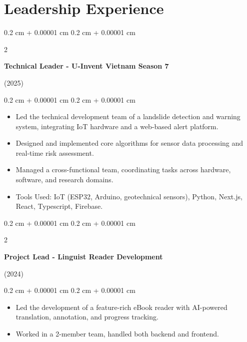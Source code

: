 \documentclass[10pt, letterpaper]{article}
\newenvironment{highlights}{
    \begin{itemize}[
        topsep=0.10 cm,
        parsep=0.10 cm,
        partopsep=0pt,
        itemsep=0pt,
        leftmargin=0.4 cm + 10pt
    ]
}{
    \end{itemize}
} %
\newenvironment{onecolentry}{
    \begin{adjustwidth}{
        0.2 cm + 0.00001 cm
    }{
        0.2 cm + 0.00001 cm
    }
}{
    \end{adjustwidth}
} %
\newenvironment{twocolentry}[2][]{
    \onecolentry
    \def\secondColumn{#2}
    \setcolumnwidth{\fill, 4.5 cm}
    \begin{paracol}{2}
}{
    \switchcolumn \raggedleft \secondColumn
    \end{paracol}
    \endonecolentry
} %
\begin{document}
    \vspace{0.2 cm}

    

\vspace{0.2 cm}

\section{Leadership Experience}

    \begin{twocolentry}{(2025)}
    \textbf{Technical Leader - U-Invent Vietnam Season 7}
    \end{twocolentry}
    
    \vspace{0.10 cm}
    \begin{onecolentry}
        \begin{highlights}
            \item Led the technical development team of a landslide detection and warning system, integrating IoT hardware and a web-based alert platform.
            \item Designed and implemented core algorithms for sensor data processing and real-time risk assessment.
            \item Managed a cross-functional team, coordinating tasks across hardware, software, and research domains.
            \item Tools Used: IoT (ESP32, Arduino, geotechnical sensors), Python, Next.js, React, Typescript, Firebase.
        \end{highlights}
    \end{onecolentry}
    
    \vspace{0.2 cm}
    
    \begin{twocolentry}{(2024)}
        \textbf{Project Lead - Linguist Reader Development}
    \end{twocolentry}

    \vspace{0.10 cm}
    \begin{onecolentry}
        \begin{highlights}
            \item Led the development of a feature-rich eBook reader with AI-powered translation, annotation, and progress tracking.
            \item Worked in a 2-member team, handled both backend and frontend.
        \end{highlights}
    \end{onecolentry}
\end{document}
